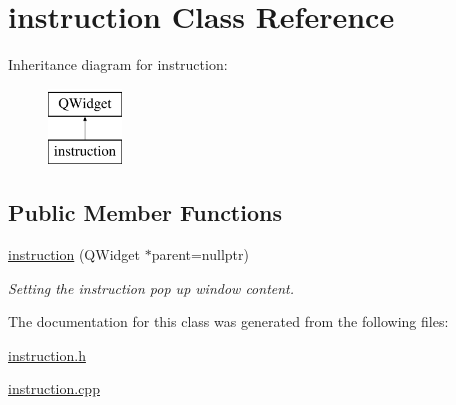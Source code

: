 \hypertarget{classinstruction}{\section{instruction Class Reference}
\label{classinstruction}
}
Inheritance diagram for instruction\-:\begin{figure}[H]
\begin{center}
\leavevmode
\includegraphics[height=2.000000cm]{classinstruction}
\end{center}
\end{figure}
\subsection*{Public Member Functions}
\begin{DoxyCompactItemize}
\item 
\hypertarget{classinstruction_a8d62f94c25b1e482cc5f71cdf593e70e}{\hyperlink{classinstruction_a8d62f94c25b1e482cc5f71cdf593e70e}{instruction} (Q\-Widget $\ast$parent=nullptr)}\label{classinstruction_a8d62f94c25b1e482cc5f71cdf593e70e}

\begin{DoxyCompactList}\small\item\em Setting the instruction pop up window content. \end{DoxyCompactList}\end{DoxyCompactItemize}


The documentation for this class was generated from the following files\-:\begin{DoxyCompactItemize}
\item 
\hyperlink{instruction_8h}{instruction.\-h}\item 
\hyperlink{instruction_8cpp}{instruction.\-cpp}\end{DoxyCompactItemize}
